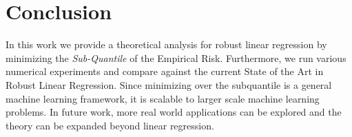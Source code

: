 \documentclass{article} %
\begin{document}
	\section{Conclusion}
	In this work we provide a theoretical analysis for robust linear regression by minimizing the \textit{Sub-Quantile} of the Empirical Risk. Furthermore, we run various numerical experiments and compare against the current State of the Art in Robust Linear Regression. Since minimizing over the subquantile is a general machine learning framework, it is scalable to larger scale machine learning problems. In future work, more real world applications can be explored and the theory can be expanded beyond linear regression. 
	
	\newpage

	
	
	
\end{document}
